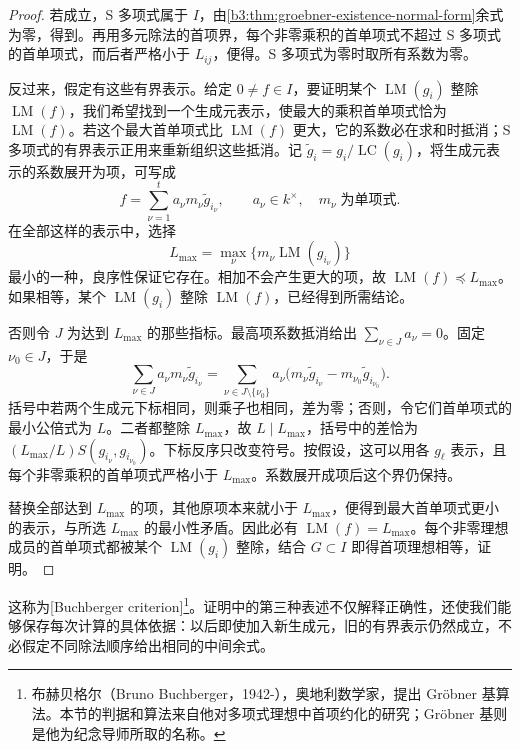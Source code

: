 \begin{proof}
	若成立，S 多项式属于 \(I\)，由\cref{b3:thm:groebner-existence-normal-form}余式为零，得到。再用多元除法的首项界，每个非零乘积的首单项式不超过 S 多项式的首单项式，而后者严格小于 \(L_{ij}\)，便得。S 多项式为零时取所有系数为零。

	反过来，假定有这些有界表示。给定 \(0\ne f\in I\)，要证明某个 \(\operatorname{LM}(g_i)\) 整除 \(\operatorname{LM}(f)\)，我们希望找到一个生成元表示，使最大的乘积首单项式恰为 \(\operatorname{LM}(f)\)。若这个最大首单项式比 \(\operatorname{LM}(f)\) 更大，它的系数必在求和时抵消；S 多项式的有界表示正用来重新组织这些抵消。记 \(\widetilde g_i=g_i/\operatorname{LC}(g_i)\)，将生成元表示的系数展开为项，可写成
	\[
		f=\sum_{\nu=1}^t a_\nu m_\nu\widetilde g_{i_\nu}, \qquad a_\nu\in k^\times,\quad m_\nu\;\text{为单项式}.
	\]
	在全部这样的表示中，选择
	\[
		L_{\max}=\max_\nu\bigl\{m_\nu\operatorname{LM}(g_{i_\nu})\bigr\}
	\]
	最小的一种，良序性保证它存在。相加不会产生更大的项，故 \(\operatorname{LM}(f)\preceq L_{\max}\)。如果相等，某个 \(\operatorname{LM}(g_i)\) 整除 \(\operatorname{LM}(f)\)，已经得到所需结论。

	否则令 \(J\) 为达到 \(L_{\max}\) 的那些指标。最高项系数抵消给出 \(\sum_{\nu\in J}a_\nu=0\)。固定 \(\nu_0\in J\)，于是
	\[
		\sum_{\nu\in J}a_\nu m_\nu\widetilde g_{i_\nu} =\sum_{\nu\in J\setminus\{\nu_0\}} a_\nu\bigl(m_\nu\widetilde g_{i_\nu} -m_{\nu_0}\widetilde g_{i_{\nu_0}}\bigr).
	\]
	括号中若两个生成元下标相同，则乘子也相同，差为零；否则，令它们首单项式的最小公倍式为 \(L\)。二者都整除 \(L_{\max}\)，故 \(L\mid L_{\max}\)，括号中的差恰为 \((L_{\max}/L)S(g_{i_\nu},g_{i_{\nu_0}})\)。下标反序只改变符号。按假设，这可以用各 \(g_\ell\) 表示，且每个非零乘积的首单项式严格小于 \(L_{\max}\)。系数展开成项后这个界仍保持。

	替换全部达到 \(L_{\max}\) 的项，其他原项本来就小于 \(L_{\max}\)，便得到最大首单项式更小的表示，与所选 \(L_{\max}\) 的最小性矛盾。因此必有 \(\operatorname{LM}(f)=L_{\max}\)。每个非零理想成员的首单项式都被某个 \(\operatorname{LM}(g_i)\) 整除，结合 \(G\subset I\) 即得首项理想相等，证明。
\end{proof}

这称为[Buchberger criterion]\footnote{布赫贝格尔（Bruno Buchberger，1942-），奥地利数学家，提出 Gröbner 基算法。本节的判据和算法来自他对多项式理想中首项约化的研究；Gröbner 基则是他为纪念导师所取的名称。}。证明中的第三种表述不仅解释正确性，还使我们能够保存每次计算的具体依据：以后即使加入新生成元，旧的有界表示仍然成立，不必假定不同除法顺序给出相同的中间余式。

